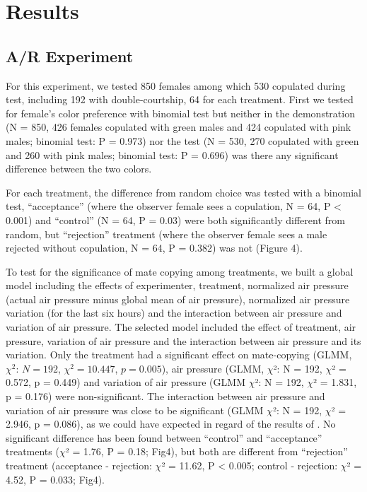 \documentclass[a4paper, 12pt]{article}
\begin{document}
	\section{Results}

	\subsection{A/R Experiment}
	\label{subsec:AR-experiment}

	For this experiment, we tested 850 females among which 530 copulated during test, including 192 with double-courtship, 64 for each treatment. First we tested for female's color preference with binomial test but neither in the demonstration (N = 850, 426 females copulated with green males and 424 copulated with pink males; binomial test: P = 0.973) nor the test (N = 530, 270 copulated with green and 260 with pink males; binomial test: P = 0.696) was there any significant difference between the two colors.

	For each treatment, the difference from random choice was tested with a binomial test, ``acceptance'' (where the observer female sees a copulation, N = 64, P {\textless} 0.001) and ``control'' (N = 64, P = 0.03) were both significantly different from random, but ``rejection'' treatment (where the observer female sees a male rejected without copulation, N = 64, P = 0.382) was not (Figure 4).

	To test for the significance of mate copying among treatments, we built a global model including the effects of experimenter, treatment, normalized air pressure (actual air pressure minus global mean of air pressure), normalized air pressure variation (for the last six hours) and the interaction between air pressure and variation of air pressure. The selected model included the effect of treatment, air pressure, variation of air pressure and the interaction between air pressure and its variation. Only the treatment had a significant effect on mate-copying (GLMM, $\chi^2$: $N = 192$, $\chi^2 = 10.447$, $p = 0.005$), air pressure (GLMM, $\chi $²: N = 192, $\chi $² = 0.572, p = 0.449) and variation of air pressure (GLMM $\chi $²: N = 192, $\chi $² = 1.831, p = 0.176) were non-significant. The interaction between air pressure and variation of air pressure was close to be significant (GLMM $\chi $²: N = 192, $\chi $² = 2.946, p = 0.086), as we could have expected in regard of the results of \textcite{dagaeff_drosophila_2016}. No significant difference has been found between ``control'' and ``acceptance'' treatments ($\chi $² = 1.76, P = 0.18; Fig4), but both are different from ``rejection'' treatment (acceptance - rejection: $\chi $² = 11.62, P {\textless} 0.005; control - rejection: $\chi $² = 4.52, P = 0.033; Fig4).
	
\end{document}

